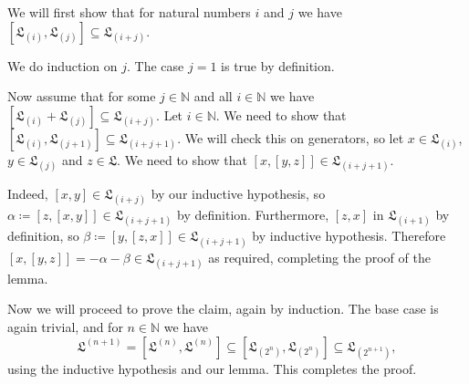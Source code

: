We will first show that for natural numbers $i$ and $j$ we have $[\mathfrak{L}_{(i)}, \mathfrak{L}_{(j)}] \subseteq \mathfrak{L}_{(i + j)}$.

We do induction on $j$. The case $j = 1$ is true by definition.

Now assume that for some $j \in \mathbb{N}$ and all $i \in \mathbb{N}$ we have $[\mathfrak{L}_{(i)} + \mathfrak{L}_{(j)}] \subseteq \mathfrak{L}_{(i + j)}$.
Let $i \in \mathbb{N}$. We need to show that $[\mathfrak{L}_{(i)}, \mathfrak{L}_{(j + 1)}] \subseteq \mathfrak{L}_{(i + j + 1)}$.
We will check this on generators, so let $x \in \mathfrak{L}_{(i)}$, $y \in \mathfrak{L}_{(j)}$ and $z \in \mathfrak{L}$.
We need to show that $[x, [y, z]] \in \mathfrak{L}_{(i+j+1)}$.

Indeed, $[x, y] \in \mathfrak{L}_{(i + j)}$ by our inductive hypothesis, so
$\alpha\coloneqq[z, [x, y]] \in \mathfrak{L}_{(i + j + 1)}$ by definition. Furthermore, $[z, x]$ in $\mathfrak{L}_{(i + 1)}$ by
definition, so $\beta\coloneqq[y, [z, x]] \in \mathfrak{L}_{(i + j + 1)}$ by inductive
hypothesis. Therefore  $[x, [y, z]] = -\alpha-\beta \in \mathfrak{L}_{(i + j + 1)}$
as required, completing the proof of the lemma.

Now we will proceed to prove the claim, again by induction. The base case is again
trivial, and for $n \in \mathbb{N}$ we have
\[ \mathfrak{L}^{(n+1)} = [\mathfrak{L}^{(n)}, \mathfrak{L}^{(n)}] \subseteq [\mathfrak{L}_{(2^n)}, \mathfrak{L}_{(2^n)}] \subseteq \mathfrak{L}_{(2^{n+1})}, \]
using the inductive hypothesis and our lemma. This completes the proof.
